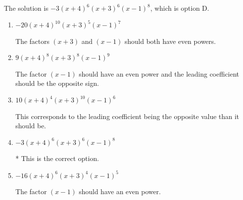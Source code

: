 \documentclass{extbook}[14pt]
\begin{document}
\begin{enumerate}
{The solution is \( -3(x + 4)^{6} (x + 3)^{6} (x - 1)^{8} \), which is option D.\begin{enumerate}[label=\Alph*.]
\item \( -20(x + 4)^{10} (x + 3)^{5} (x - 1)^{7} \)

The factors $(x + 3)$ and $(x - 1)$ should both have even powers.
\item \( 9(x + 4)^{8} (x + 3)^{8} (x - 1)^{9} \)

The factor $(x - 1)$ should have an even power and the leading coefficient should be the opposite sign.
\item \( 10(x + 4)^{4} (x + 3)^{10} (x - 1)^{6} \)

This corresponds to the leading coefficient being the opposite value than it should be.
\item \( -3(x + 4)^{6} (x + 3)^{6} (x - 1)^{8} \)

* This is the correct option.
\item \( -16(x + 4)^{6} (x + 3)^{4} (x - 1)^{5} \)

The factor $(x - 1)$ should have an even power.
\end{enumerate}

}
\end{enumerate}
\end{document}
